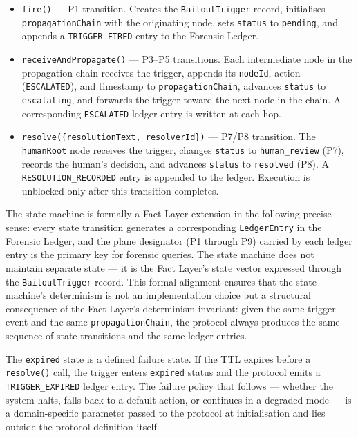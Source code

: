 \begin{itemize}
  \item \texttt{fire()} — P1 transition.  Creates the \texttt{BailoutTrigger} record,
        initialises \texttt{propagationChain} with the originating node, sets
        \texttt{status} to \texttt{pending}, and appends a \texttt{TRIGGER\_FIRED}
        entry to the Forensic Ledger.

  \item \texttt{receiveAndPropagate()} — P3--P5 transitions.  Each intermediate node
        in the propagation chain receives the trigger, appends its \texttt{nodeId},
        action (\texttt{ESCALATED}), and timestamp to \texttt{propagationChain},
        advances \texttt{status} to \texttt{escalating}, and forwards the trigger
        toward the next node in the chain.  A corresponding \texttt{ESCALATED}
        ledger entry is written at each hop.

  \item \texttt{resolve(\{resolutionText, resolverId\})} — P7/P8 transition.
        The \texttt{humanRoot} node receives the trigger, changes \texttt{status}
        to \texttt{human\_review} (P7), records the human's decision, and advances
        \texttt{status} to \texttt{resolved} (P8).  A \texttt{RESOLUTION\_RECORDED}
        entry is appended to the ledger.  Execution is unblocked only after this
        transition completes.
\end{itemize}

The state machine is formally a Fact Layer extension in the following precise sense:
every state transition generates a corresponding \texttt{LedgerEntry} in the
Forensic Ledger, and the plane designator (P1 through P9) carried by each ledger
entry is the primary key for forensic queries.  The state machine does not maintain
separate state — it is the Fact Layer's state vector expressed through the
\texttt{BailoutTrigger} record.  This formal alignment ensures that the state
machine's determinism is not an implementation choice but a structural consequence
of the Fact Layer's determinism invariant: given the same trigger event and the same
\texttt{propagationChain}, the protocol always produces the same sequence of state
transitions and the same ledger entries.

The \texttt{expired} state is a defined failure state.  If the TTL expires before
a \texttt{resolve()} call, the trigger enters \texttt{expired} status and the
protocol emits a \texttt{TRIGGER\_EXPIRED} ledger entry.  The failure policy that
follows — whether the system halts, falls back to a default action, or continues
in a degraded mode — is a domain-specific parameter passed to the protocol at
initialisation and lies outside the protocol definition itself.


